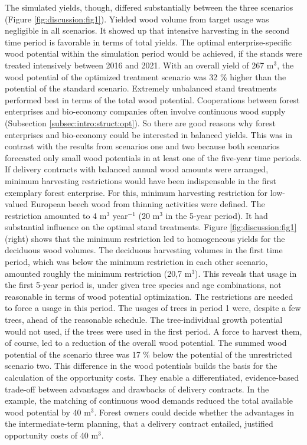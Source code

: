 The simulated yields, though, differed substantially between the three scenarios (Figure \ref{fig:discussion:fig1}). Yielded wood volume from target usage was negligible in all scenarios. It showed up that intensive harvesting in the second time period is favorable in terms of total yields. The optimal enterprise-specific wood potential within the simulation period would be achieved, if the stands were treated intensively between 2016 and 2021. With an overall yield of 267 m$^3$, the wood potential of the optimized treatment scenario was 32 \% higher than the potential of the standard scenario. Extremely unbalanced stand treatments performed best in terms of the total wood potential. Cooperations between forest enterprises and bio-economy companies often involve continuous wood supply (Subsection \ref{subsec:intro:struct:opt}). So there are good reasons why forest enterprises and bio-economy could be interested in balanced yields. This was in contrast with the results from scenarios one and two because both scenarios forecasted only small wood potentials in at least one of the five-year time periods. If delivery contracts with balanced annual wood amounts were arranged, minimum harvesting restrictions would have been indispensable in the first exemplary forest enterprise. For this, minimum harvesting restriction for low-valued European beech wood from thinning activities were defined. The restriction amounted to 4 m$^3$ year$^{-1}$ (20 m$^3$ in the 5-year period). It had substantial influence on the optimal stand treatments. Figure \ref{fig:discussion:fig1} (right) shows that the minimum restriction led to homogeneous yields for the deciduous wood volumes. The deciduous harvesting volumes in the first time period, which was below the minimum restriction in each other scenario, amounted roughly the minimum restriction (20,7 m$^3$). This reveals that usage in the first 5-year period is, under given tree species and age combinations, not reasonable in terms of wood potential optimization. The restrictions are needed to force a usage in this period. The usages of trees in period 1 were, despite a few trees, ahead of the reasonable schedule. The tree-individual growth potential would not used, if the trees were used in the first period. A force to harvest them, of course, led to a reduction of the overall wood potential. The summed wood potential of the scenario three was 17 \% below the potential of the unrestricted scenario two. This difference in the wood potentials builds the basis for the calculation of the opportunity costs. They enable a differentiated, evidence-based trade-off between advantages and drawbacks of delivery contracts. In the example, the matching of continuous wood demands reduced the total available wood potential by 40 m$^3$. Forest owners could decide whether the advantages in the intermediate-term planning, that a delivery contract entailed, justified opportunity costs of 40 m$^3$.


